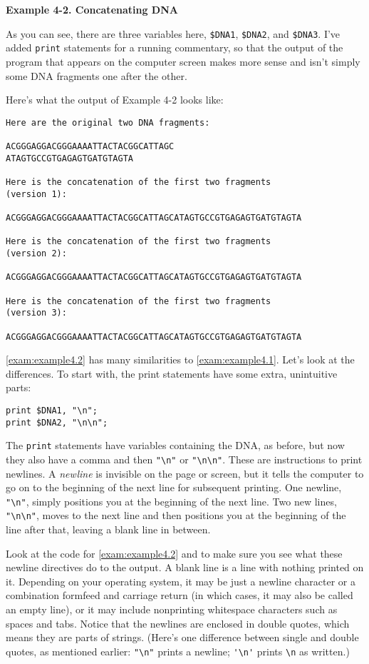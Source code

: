 \textbf{Example 4-2. Concatenating DNA}


As you can see, there are three variables here, \verb|$DNA1|, \verb|$DNA2|, and \verb|$DNA3|.  I've added \verb|print| statements for a running commentary, so that the output of the program that appears on the computer screen makes more sense and isn't simply some DNA fragments one after the other.

Here's what the output of Example 4-2 looks like:

\begin{lstlisting}
Here are the original two DNA fragments:

ACGGGAGGACGGGAAAATTACTACGGCATTAGC
ATAGTGCCGTGAGAGTGATGTAGTA

Here is the concatenation of the first two fragments
(version 1):

ACGGGAGGACGGGAAAATTACTACGGCATTAGCATAGTGCCGTGAGAGTGATGTAGTA

Here is the concatenation of the first two fragments
(version 2):

ACGGGAGGACGGGAAAATTACTACGGCATTAGCATAGTGCCGTGAGAGTGATGTAGTA

Here is the concatenation of the first two fragments
(version 3):

ACGGGAGGACGGGAAAATTACTACGGCATTAGCATAGTGCCGTGAGAGTGATGTAGTA
\end{lstlisting}

\autoref{exam:example4.2} has many similarities to \autoref{exam:example4.1}. Let's look at the differences. To start with, the print statements have some extra, unintuitive parts:

\begin{lstlisting}
print $DNA1, "\n";
print $DNA2, "\n\n";
\end{lstlisting}

The \verb|print| statements have variables containing the DNA, as before, but now they also have a comma and then \verb|"\n"| or \verb|"\n\n"|. These are instructions to print newlines. A \textit{newline} is invisible on the page or screen, but it tells the computer to go on to the beginning of the next line for subsequent printing. One newline, \verb|"\n"|, simply positions you at the beginning of the next line. Two new lines, \verb|"\n\n"|, moves to the next line and then positions you at the beginning of the line after that, leaving a blank line in between.  

Look at the code for \autoref{exam:example4.2} and to make sure you see what these newline directives do to the output. A blank line is a line with nothing printed on it. Depending on your operating system, it may be just a newline character or a combination formfeed and carriage return (in which cases, it may also be called an empty line), or it may include nonprinting whitespace characters such as spaces and tabs. Notice that the newlines are enclosed in double quotes, which means they are parts of strings. (Here's one difference between single and double quotes, as mentioned earlier: \verb|"\n"| prints a newline; \verb|'\n'| prints \verb|\n| as written.)

